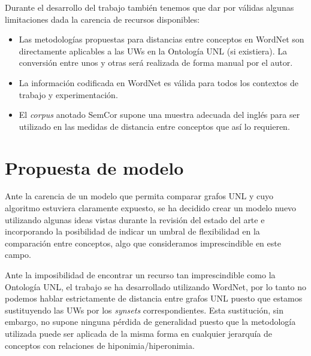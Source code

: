 \documentclass[a4paper,12pt,spanish]{book}
\begin{document}
Durante el desarrollo del trabajo también tenemos que dar por válidas algunas limitaciones
dada la carencia de recursos disponibles:
\begin{itemize}
\item {} 
Las metodologías propuestas para distancias entre conceptos en WordNet son directamente
aplicables a las UWs en la Ontología UNL (si existiera). La conversión entre unos y otras
será realizada de forma manual por el autor.

\item {} 
La información codificada en WordNet es válida para todos los contextos de trabajo y
experimentación.

\item {} 
El \emph{corpus} anotado SemCor supone una muestra adecuada del inglés para ser utilizado
en las medidas de distancia entre conceptos que así lo requieren.

\end{itemize}
\newpage

\chapter{Propuesta de modelo}
\label{4.model/index::doc}\label{4.model/index:propuesta-de-modelo}
Ante la carencia de un modelo que permita comparar grafos UNL y cuyo algoritmo estuviera
claramente expuesto, se ha decidido crear un modelo nuevo utilizando algunas ideas
vistas durante la revisión del estado del arte e incorporando la posibilidad de indicar un
umbral de flexibilidad en la comparación entre conceptos, algo que consideramos
imprescindible en este campo.

Ante la imposibilidad de encontrar un recurso tan imprescindible como la Ontología UNL,
el trabajo se ha desarrollado utilizando WordNet, por lo tanto no podemos hablar estrictamente
de distancia entre grafos UNL puesto que estamos sustituyendo las UWs por los \emph{synsets}
correspondientes.
Esta sustitución, sin embargo, no supone ninguna pérdida de generalidad puesto que la
metodología utilizada puede ser aplicada de la misma forma en cualquier jerarquía de
conceptos con relaciones de hiponimia/hiperonimia.
\end{document}
